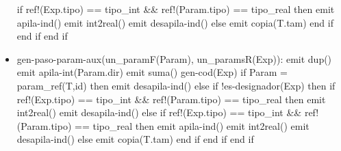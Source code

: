 \documentclass[11pt]{article}
\begin{document}
\begin{itemize}
                        \subsubitem \hspace{2em} if ref!(Exp.tipo) == tipo\_int \&\& ref!(Param.tipo) == tipo\_real then
                            \subsubitem \hspace{4em} emit apila-ind()
                            \subsubitem \hspace{4em} emit int2real()
                            \subsubitem \hspace{4em} emit desapila-ind()
                        \subsubitem \hspace{2em} else
                            \subsubitem \hspace{4em} emit copia(T.tam)
                        \subsubitem \hspace{2em} end if
                    \subsubitem end if
                \subitem end if
            \item gen-paso-param-aux(un\_paramF(Param), un\_paramsR(Exp)): 
                \subitem emit dup()
                \subitem emit apila-int(Param.dir)
                \subitem emit suma()
                \subitem gen-cod(Exp)
                \subitem if Param = param\_ref(T,id) then
                    \subsubitem \hspace{2em} emit desapila-ind()
                \subitem else if !es-designador(Exp) then
                    \subsubitem \hspace{2em} if ref!(Exp.tipo) == tipo\_int \&\& ref!(Param.tipo) == tipo\_real then
                        \subsubitem \hspace{4em} emit int2real()
                    \subsubitem \hspace{2em} emit desapila-ind()
                    \subsubitem \hspace{2em} else
                    \subsubitem \hspace{4em} if ref!(Exp.tipo) == tipo\_int \&\& ref!(Param.tipo) == tipo\_real then
                        \subsubitem \hspace{6em} emit apila-ind()
                        \subsubitem \hspace{6em} emit int2real()
                        \subsubitem \hspace{6em} emit desapila-ind()
                    \subsubitem \hspace{4em} else
                        \subsubitem \hspace{6em} emit copia(T.tam)
                    \subsubitem \hspace{4em} end if
                    \subsubitem \hspace{2em} end if
                \subitem end if
        \end{itemize} 
\end{document}

